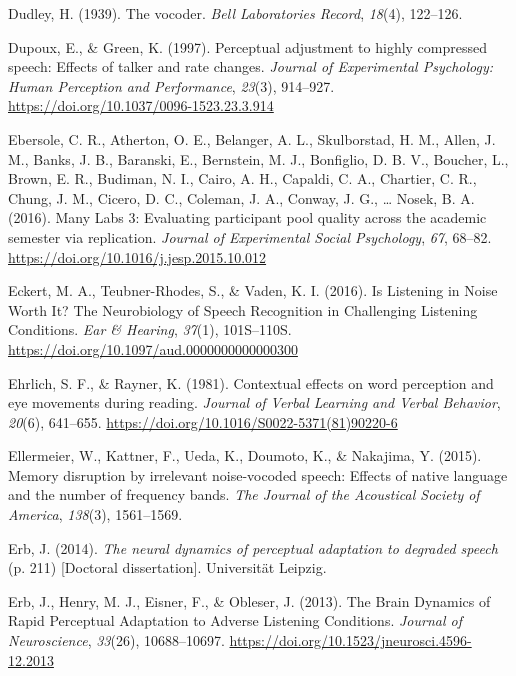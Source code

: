 \documentclass[a4paper, nobind]{templates/ociamthesis}
\newlength{\cslhangindent}
\newenvironment{CSLReferences}[2] %
 {%
  \setlength{\parindent}{0pt}
  \ifodd #1
  \let\oldpar\par
  \def\par{\hangindent=\cslhangindent\oldpar}
  \fi
  \setlength{\parskip}{1mm}
  \setlength{\baselineskip}{6mm}
 }%
 {}
\begin{document}
\begin{CSLReferences}{1}{0}
\leavevmode{}%
Dudley, H. (1939). {The vocoder}. \emph{Bell Laboratories Record}, \emph{18}(4), 122--126.

\leavevmode{}%
Dupoux, E., \& Green, K. (1997). Perceptual adjustment to highly compressed speech: Effects of talker and rate changes. \emph{Journal of Experimental Psychology: Human Perception and Performance}, \emph{23}(3), 914--927. \url{https://doi.org/10.1037/0096-1523.23.3.914}

\leavevmode{}%
Ebersole, C. R., Atherton, O. E., Belanger, A. L., Skulborstad, H. M., Allen, J. M., Banks, J. B., Baranski, E., Bernstein, M. J., Bonfiglio, D. B. V., Boucher, L., Brown, E. R., Budiman, N. I., Cairo, A. H., Capaldi, C. A., Chartier, C. R., Chung, J. M., Cicero, D. C., Coleman, J. A., Conway, J. G., \ldots{} Nosek, B. A. (2016). {Many Labs 3: Evaluating participant pool quality across the academic semester via replication}. \emph{Journal of Experimental Social Psychology}, \emph{67}, 68--82. \url{https://doi.org/10.1016/j.jesp.2015.10.012}

\leavevmode{}%
Eckert, M. A., Teubner-Rhodes, S., \& Vaden, K. I. (2016). Is Listening in Noise Worth It? The Neurobiology of Speech Recognition in Challenging Listening Conditions. \emph{Ear \& Hearing}, \emph{37}(1), 101S--110S. \url{https://doi.org/10.1097/aud.0000000000000300}

\leavevmode{}%
Ehrlich, S. F., \& Rayner, K. (1981). {Contextual effects on word perception and eye movements during reading}. \emph{Journal of Verbal Learning and Verbal Behavior}, \emph{20}(6), 641--655. \url{https://doi.org/10.1016/S0022-5371(81)90220-6}

\leavevmode{}%
Ellermeier, W., Kattner, F., Ueda, K., Doumoto, K., \& Nakajima, Y. (2015). Memory disruption by irrelevant noise-vocoded speech: Effects of native language and the number of frequency bands. \emph{The Journal of the Acoustical Society of America}, \emph{138}(3), 1561--1569.

\leavevmode{}%
Erb, J. (2014). \emph{{The neural dynamics of perceptual adaptation to degraded speech}} (p. 211) {[}Doctoral dissertation{]}. Universit{ä}t Leipzig.

\leavevmode{}%
Erb, J., Henry, M. J., Eisner, F., \& Obleser, J. (2013). The Brain Dynamics of Rapid Perceptual Adaptation to Adverse Listening Conditions. \emph{Journal of Neuroscience}, \emph{33}(26), 10688--10697. \url{https://doi.org/10.1523/jneurosci.4596-12.2013}


\end{CSLReferences}
\end{document}

